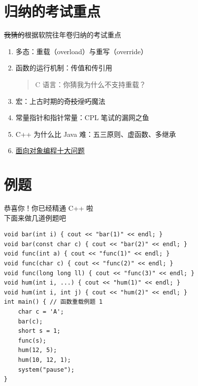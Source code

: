 \documentclass[10pt,aspectratio=169,mathserif]{beamer}
\begin{document}
\section{归纳的考试重点}
\begin{frame}{\sout{我猜的}根据软院往年卷归纳的考试重点}

	\begin{enumerate}
		\def\labelenumi{\arabic{enumi}.}
		\item
		      多态：重载（overload）与重写（override）
		\item
		      函数的运行机制：传值和传引用

		      \begin{quote}
			      C 语言：你猜我为什么不支持重载？
		      \end{quote}
		\item
		      宏：上古时期的\sout{奇技淫巧}魔法
		\item
		      常量指针和指针常量：CPL 笔试的漏网之鱼
		\item
		      C++ 为什么比 Java 难：五三原则、虚函数、多继承
		\item
		      \href{https://eaglebear2002.github.io/2022Spring-C++\%20\%E9\%AB\%98\%E7\%BA\%A7\%E7\%A8\%8B\%E5\%BA\%8F\%E8\%AE\%BE\%E8\%AE\%A1/C++\%20\%E9\%AB\%98\%E7\%BA\%A7\%E7\%A8\%8B\%E5\%BA\%8F\%E8\%AE\%BE\%E8\%AE\%A1-25-\%E9\%9D\%A2\%E5\%90\%91\%E5\%AF\%B9\%E8\%B1\%A1\%E7\%BC\%96\%E7\%A8\%8B\%E5\%8D\%81\%E5\%A4\%A7\%E9\%97\%AE\%E9\%A2\%98/}{面向对象编程十大问题}
	\end{enumerate}
\end{frame}

\section{例题}
\begin{frame}
	\vfill
	\centering
	\Large 恭喜你！你已经精通 C++ 啦\\
	下面来做几道例题吧
	\vfill
\end{frame}

\begin{frame}[fragile]
	\begin{lstlisting}
void bar(int i) { cout << "bar(1)" << endl; }
void bar(const char c) { cout << "bar(2)" << endl; }
void func(int a) { cout << "func(1)" << endl; }
void func(char c) { cout << "func(2)" << endl; }
void func(long long ll) { cout << "func(3)" << endl; }
void hum(int i, ...) { cout << "hum(1)" << endl; }
void hum(int i, int j) { cout << "hum(2)" << endl; }
int main() { // 函数重载例题 1
    char c = 'A';
    bar(c);
    short s = 1;
    func(s);
    hum(12, 5);
    hum(10, 12, 1);
    system("pause");
}
\end{lstlisting}
\end{frame}
\end{document}
